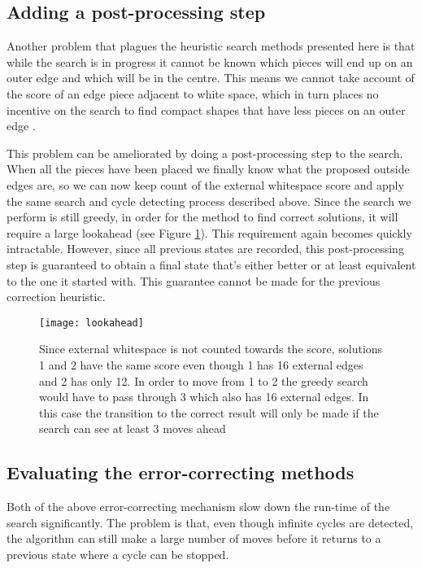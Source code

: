 \subsection{Adding a post-processing step}
Another problem that plagues the heuristic search methods presented here is that while the search is in progress it cannot be known which pieces will end up on an outer edge and which will be in the centre. This means we cannot take account of the score of an edge piece adjacent to white space, which in turn places no incentive on the search to find compact shapes that have less pieces on an outer edge .

This problem can be ameliorated by doing a post-processing step to the search. When all the pieces have been placed we finally know what the proposed outside edges are, so we can now keep count of the external whitespace score and apply the same search and cycle detecting process described above. Since the search we perform is still greedy, in order for the method to find correct solutions, it will require a large lookahead (see Figure \ref{fig:lookahead}). This requirement again becomes quickly intractable. However, since all previous states are recorded, this post-processing step is guaranteed to obtain a final state that’s either better or at least equivalent to the one it started with. This guarantee cannot be made for the previous correction heuristic.

\begin{figure}[h]
  \centering
  \texttt{[image: lookahead]}
  \caption{Since external whitespace is not counted towards the score, solutions 1 and 2 have the same score even though 1 has 16 external edges and 2 has only 12. In order to move from 1 to 2 the greedy search would have to pass through 3 which also has 16 external edges. In this case the transition to the correct result will only be made if the search can see at least 3 moves ahead}
  \label{fig:lookahead}
\end{figure}

\subsection{Evaluating the error-correcting methods}
Both of the above error-correcting mechanism slow down the run-time of the search significantly. The problem is that, even though infinite cycles are detected, the algorithm can still make a large number of moves before it returns to a previous state where a cycle can be stopped.

